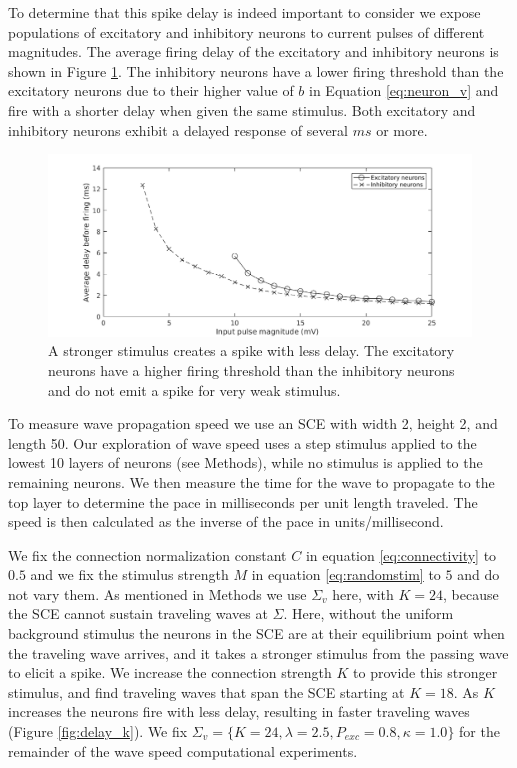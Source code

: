 To determine  that this spike delay is indeed important to consider  we expose populations of excitatory and inhibitory neurons to current pulses of different magnitudes.
The average firing delay of the excitatory and inhibitory neurons is shown in Figure \ref{fig:delay_neurondynamics}.
The inhibitory neurons have a lower firing threshold than the excitatory neurons due to their higher value of $b$ in Equation \ref{eq:neuron_v}  \citet{izhikevich2003} and fire with a shorter delay when given the same stimulus.
Both excitatory and inhibitory neurons exhibit a delayed response of several $ms$ or more.
\begin{figure}[!htb]
 \centering
   \includegraphics[width=\textwidth]{fig/WaveSpeed_NeuronDynamics}
   \caption{ A stronger stimulus creates a spike with less delay. The excitatory neurons have a higher firing threshold than the inhibitory neurons and do not emit a spike for very weak stimulus.}
   \label{fig:delay_neurondynamics}
\end{figure}

\FloatBarrier

To measure wave propagation speed we use an SCE with width 2, height 2, and length 50.
Our exploration of wave speed uses a step stimulus applied to the lowest 10 layers of neurons (see Methods), while no stimulus is applied to the remaining neurons.
We then measure the time for the wave to propagate to the top layer to determine the pace in milliseconds per unit length traveled.
The speed is then calculated as the inverse of the pace in units/millisecond.

We fix the connection normalization constant $C$ in equation \ref{eq:connectivity} to $0.5$ and we fix the stimulus strength $M$ in equation \ref{eq:randomstim} to $5$ and do not vary them.
As mentioned in Methods we use $\Sigma_v$ here, with $K=24$, because the SCE cannot sustain traveling waves at $\Sigma$. 
Here, without the uniform background stimulus the neurons in the SCE are at their equilibrium point when the traveling wave arrives, and it takes a stronger stimulus from the passing wave to elicit a spike.
We increase the connection strength $K$ to provide this stronger stimulus, and find traveling waves that span the SCE starting at $K=18$. 
As $K$ increases the neurons fire with less delay, resulting in faster traveling waves (Figure \ref{fig:delay_k}).
We fix $\Sigma_v = \{K=24,\lambda=2.5,P_{exc}=0.8,\kappa=1.0 \}$ for the remainder of the wave speed computational experiments.

